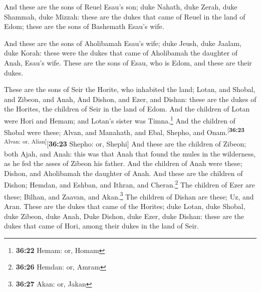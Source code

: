  And these are the sons of Reuel Esau's son; duke Nahath,
duke Zerah, duke Shammah, duke Mizzah: these are the dukes that came of
Reuel in the land of Edom; these are the sons of Bashemath Esau's wife.

 And these are the sons of Aholibamah Esau's wife; duke
Jeush, duke Jaalam, duke Korah: these were the dukes that came of
Aholibamah the daughter of Anah, Esau's wife.  These are
the sons of Esau, who is Edom, and these are their dukes.

 These are the sons of Seir the Horite, who inhabited the
land; Lotan, and Shobal, and Zibeon, and Anah,  And
Dishon, and Ezer, and Dishan: these are the dukes of the Horites, the
children of Seir in the land of Edom.  And the children
of Lotan were Hori and Hemam; and Lotan's sister was Timna.\footnote{\textbf{36:22}
  Hemam: or, Homam}  And the children of Shobal were
these; Alvan, and Manahath, and Ebal, Shepho, and
Onam.\textsuperscript{{[}\textbf{36:23} Alvan: or,
Alian{]}}{[}\textbf{36:23} Shepho: or, Shephi{]}  And
these are the children of Zibeon; both Ajah, and Anah: this was that
Anah that found the mules in the wilderness, as he fed the asses of
Zibeon his father.  And the children of Anah were these;
Dishon, and Aholibamah the daughter of Anah.  And these
are the children of Dishon; Hemdan, and Eshban, and Ithran, and
Cheran.\footnote{\textbf{36:26} Hemdan: or, Amram}  The
children of Ezer are these; Bilhan, and Zaavan, and Akan.\footnote{\textbf{36:27}
  Akan: or, Jakan}  The children of Dishan are these; Uz,
and Aran.  These are the dukes that came of the Horites;
duke Lotan, duke Shobal, duke Zibeon, duke Anah,  Duke
Dishon, duke Ezer, duke Dishan: these are the dukes that came of Hori,
among their dukes in the land of Seir.

